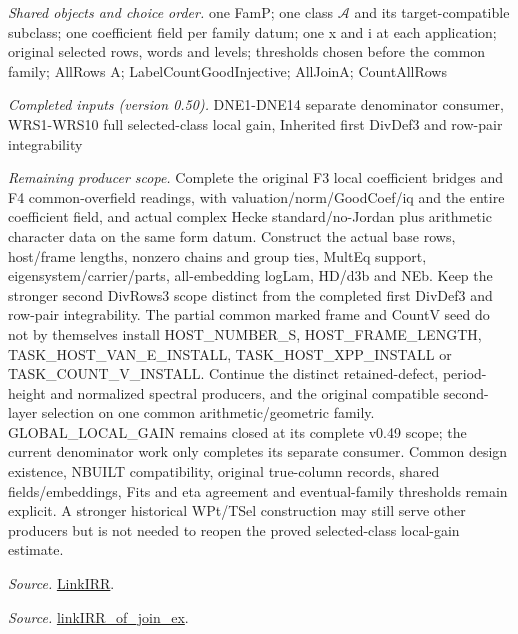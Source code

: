 \documentclass[11pt,a4paper]{article}
\numberwithin{equation}{section}
\theoremstyle{remark}\newtheorem{remark}[theorem]{Remark}
\begin{document}
\emph{Shared objects and choice order.} one FamP; one class $\mathcal A$ and its target-compatible subclass; one coefficient field per family datum; one x and i at each application; original selected rows, words and levels; thresholds chosen before the common family; AllRows A; LabelCountGoodInjective; AllJoinA; CountAllRows

\emph{Completed inputs (version 0.50).} DNE1-DNE14 separate denominator consumer, WRS1-WRS10 full selected-class local gain, Inherited first DivDef3 and row-pair integrability

\emph{Remaining producer scope.} Complete the original F3 local coefficient bridges and F4 common-overfield readings, with valuation/norm/GoodCoef/iq and the entire coefficient field, and actual complex Hecke standard/no-Jordan plus arithmetic character data on the same form datum. Construct the actual base rows, host/frame lengths, nonzero chains and group ties, MultEq support, eigensystem/carrier/parts, all-embedding logLam, HD/d3b and NEb. Keep the stronger second DivRows3 scope distinct from the completed first DivDef3 and row-pair integrability. The partial common marked frame and CountV seed do not by themselves install HOST\_\allowbreak NUMBER\_\allowbreak S, HOST\_\allowbreak FRAME\_\allowbreak LENGTH, TASK\_\allowbreak HOST\_\allowbreak VAN\_\allowbreak E\_\allowbreak INSTALL, TASK\_\allowbreak HOST\_\allowbreak XPP\_\allowbreak INSTALL or TASK\_\allowbreak COUNT\_\allowbreak V\_\allowbreak INSTALL. Continue the distinct retained-defect, period-height and normalized spectral producers, and the original compatible second-layer selection on one common arithmetic/geometric family. GLOBAL\_\allowbreak LOCAL\_\allowbreak GAIN remains closed at its complete v0.49 scope; the current denominator work only completes its separate consumer. Common design existence, NBUILT compatibility, original true-column records, shared fields/embeddings, Fits and eta agreement and eventual-family thresholds remain explicit. A stronger historical WPt/TSel construction may still serve other producers but is not needed to reopen the proved selected-class local-gain estimate.

\emph{Source.} \href{https://github.com/CocoSgt/riemann-hypothesis-lean/blob/7cbf7a0c32fca1badf05931879a37c3f8a2b03b4/src/Formalism/SharpRestriction/GlobalTheoremInputs.lean#L55-L58}{LinkIRR}.

\emph{Source.} \href{https://github.com/CocoSgt/riemann-hypothesis-lean/blob/7cbf7a0c32fca1badf05931879a37c3f8a2b03b4/src/Development/AbelianVarietyTheory/Proofs/GlobalInterpolation/LinkIRROfJoinEx.lean#L17-L38}{linkIRR\_\allowbreak of\_\allowbreak join\_\allowbreak ex}.
\end{document}
